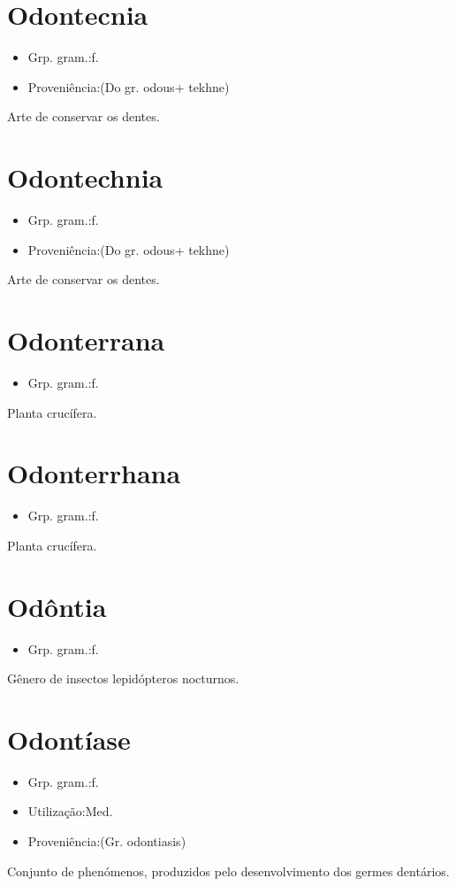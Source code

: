 \section{Odontecnia}
\begin{itemize}
\item {Grp. gram.:f.}
\end{itemize}
\begin{itemize}
\item {Proveniência:(Do gr. \textunderscore odous\textunderscore  + \textunderscore tekhne\textunderscore )}
\end{itemize}
Arte de conservar os dentes.
\section{Odontechnia}
\begin{itemize}
\item {Grp. gram.:f.}
\end{itemize}
\begin{itemize}
\item {Proveniência:(Do gr. \textunderscore odous\textunderscore  + \textunderscore tekhne\textunderscore )}
\end{itemize}
Arte de conservar os dentes.
\section{Odonterrana}
\begin{itemize}
\item {Grp. gram.:f.}
\end{itemize}
Planta crucífera.
\section{Odonterrhana}
\begin{itemize}
\item {Grp. gram.:f.}
\end{itemize}
Planta crucífera.
\section{Odôntia}
\begin{itemize}
\item {Grp. gram.:f.}
\end{itemize}
Gênero de insectos lepidópteros nocturnos.
\section{Odontíase}
\begin{itemize}
\item {Grp. gram.:f.}
\end{itemize}
\begin{itemize}
\item {Utilização:Med.}
\end{itemize}
\begin{itemize}
\item {Proveniência:(Gr. \textunderscore odontiasis\textunderscore )}
\end{itemize}
Conjunto de phenómenos, produzidos pelo desenvolvimento dos germes dentários.
